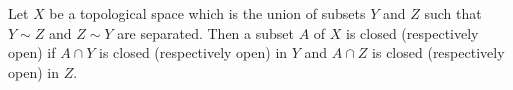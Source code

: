 Let $X$ be a topological space which is the union of subsets $Y$ and $Z$ such that $Y \sim Z$ and $Z \sim Y$ are separated. Then a subset $A$ of $X$ is closed (respectively open) if $A \cap Y$ is closed (respectively open) in $Y$ and $A \cap Z$ is closed (respectively open) in $Z$.
